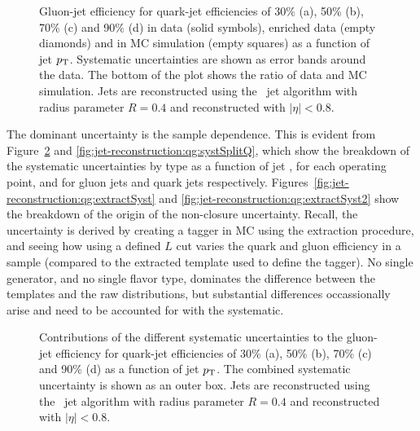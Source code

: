 \begin{figure}[htbp]
\begin{center}
\caption{
Gluon-jet efficiency for quark-jet efficiencies of 30\% (a), 50\% (b), 70\% (c) and 90\% (d) 
in data (solid symbols), enriched data (empty diamonds) and in \Herwigpp MC simulation 
(empty squares) as a function of jet $p_{\text{T}}$. 
Systematic uncertainties are shown as error bands around the data. The bottom of the plot 
shows the ratio of data and MC simulation. 
Jets are reconstructed using the \AKT\ jet algorithm with radius parameter 
$R=0.4$ and reconstructed with $|\eta|<0.8$.
}
\label{fig:jet-reconstruction:qg:perfDataMCHPP}
\end{center}
\end{figure}


The dominant uncertainty is the sample dependence. This is evident from Figure~\ref{fig:jet-reconstruction:qg:systSplit} and \ref{fig:jet-reconstruction:qg:systSplitQ}, which show the breakdown of the systematic uncertainties by type as a function of jet \pt, for each operating point, and for gluon jets and quark jets respectively. Figures~\ref{fig:jet-reconstruction:qg:extractSyst} and \ref{fig:jet-reconstruction:qg:extractSyst2} show the breakdown of the origin of the non-closure uncertainty. Recall, the uncertainty is derived by creating a tagger in MC using the extraction procedure, and seeing how using a defined $L$ cut varies the quark and gluon efficiency in a sample (compared to the extracted template used to define the tagger). No single generator, and no single flavor type, dominates the difference between the templates and the raw distributions, but substantial differences occassionally arise and need to be accounted for with the systematic.


\begin{figure}[htbp]
\begin{center}
\caption{
Contributions of the different systematic uncertainties to the gluon-jet efficiency 
for quark-jet efficiencies of 30\% (a), 50\% (b), 70\% (c) and 90\% (d) 
as a function of jet $p_{\text{T}}$. The combined systematic uncertainty is 
shown as an outer box.  
Jets are reconstructed using the \AKT\ jet algorithm with radius parameter 
$R=0.4$ and reconstructed with $|\eta|<0.8$. }
\label{fig:jet-reconstruction:qg:systSplit}
\end{center}
\end{figure}

